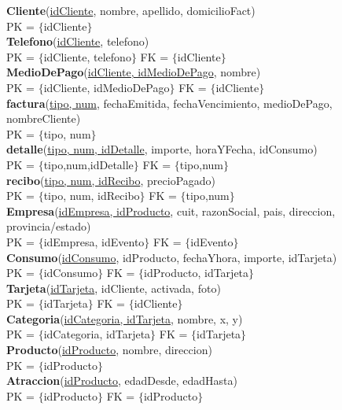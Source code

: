 \textbf{Cliente}(\underline{idCliente}, nombre, apellido, domicilioFact)\\
PK =  $\lbrace$idCliente$\rbrace$  \\
\textbf{Telefono}(\underline{idCliente}, telefono)\\
PK = $\lbrace$idCliente, telefono$\rbrace$ FK = $\lbrace$idCliente$\rbrace$\\
\textbf{MedioDePago}(\underline{idCliente, idMedioDePago}, nombre)\\
PK = $\lbrace$idCliente, idMedioDePago$\rbrace$ FK = $\lbrace$idCliente$\rbrace$\\
\textbf{factura}(\underline{tipo, num}, fechaEmitida, fechaVencimiento, medioDePago, nombreCliente)\\
PK = $\lbrace$tipo, num$\rbrace$ \\
\textbf{detalle}(\underline{tipo, num, idDetalle}, importe, horaYFecha, idConsumo)\\
PK = $\lbrace$tipo,num,idDetalle$\rbrace$ FK = $\lbrace$tipo,num$\rbrace$\\
\textbf{recibo}(\underline{tipo, num, idRecibo}, precioPagado)\\
PK = $\lbrace$tipo, num, idRecibo$\rbrace$ FK = $\lbrace$tipo,num$\rbrace$\\
\textbf{Empresa}(\underline{idEmpresa, idProducto}, cuit, razonSocial, pais, direccion, provincia/estado)\\
PK = $\lbrace$idEmpresa, idEvento$\rbrace$ FK = $\lbrace$idEvento$\rbrace$\\
\textbf{Consumo}(\underline{idConsumo}, idProducto, fechaYhora, importe, idTarjeta)\\
PK = $\lbrace$idConsumo$\rbrace$ FK = $\lbrace$idProducto, idTarjeta$\rbrace$\\
\textbf{Tarjeta}(\underline{idTarjeta}, idCliente, activada, foto)\\
PK = $\lbrace$idTarjeta$\rbrace$ FK = $\lbrace$idCliente$\rbrace$\\
\textbf{Categoria}(\underline{idCategoria, idTarjeta}, nombre, x, y)\\
PK = $\lbrace$idCategoria, idTarjeta$\rbrace$ FK = $\lbrace$idTarjeta$\rbrace$\\
\textbf{Producto}(\underline{idProducto}, nombre, direccion)\\
PK = $\lbrace$idProducto$\rbrace$\\
\textbf{Atraccion}(\underline{idProducto}, edadDesde, edadHasta)\\
PK = $\lbrace$idProducto$\rbrace$ FK = $\lbrace$idProducto$\rbrace$\\
